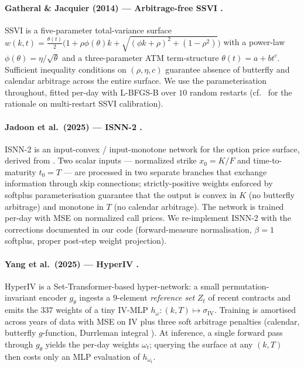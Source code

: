 \documentclass[11pt,a4paper]{article}
\newcommand{\iv}{\sigma_{\mathrm{IV}}}
\begin{document}
\paragraph{Gatheral \& Jacquier (2014) --- Arbitrage-free SSVI
\citep{gatheral2014ssvi}.} SSVI is a five-parameter total-variance surface
$w(k, t) = \tfrac{\theta(t)}{2}\bigl(1 + \rho \phi(\theta) k +
\sqrt{(\phi k + \rho)^2 + (1-\rho^2)}\bigr)$ with a power-law
$\phi(\theta) = \eta / \sqrt{\theta}$ and a three-parameter ATM
term-structure $\theta(t) = a + b t^{c}$. Sufficient inequality conditions
on $(\rho, \eta, c)$ guarantee absence of butterfly and calendar arbitrage
across the entire surface. We use the \citet{gatheral2014ssvi}
parameterisation throughout, fitted per-day with L-BFGS-B over $10$ random
restarts (cf.\ \citet{corbetta2018ssvi} for the rationale on multi-restart
SSVI calibration).

\paragraph{Jadoon et al.\ (2025) --- ISNN-2 \citep{jadoon2025isnn}.}
ISNN-2 is an input-convex / input-monotone network for the option price
surface, derived from \citet{amos2017icnn}. Two scalar inputs --- normalized
strike $x_0 = K/F$ and time-to-maturity $t_0 = T$ --- are processed in two
separate branches that exchange information through skip connections;
strictly-positive weights enforced by softplus parameterisation guarantee
that the output is convex in $K$ (no butterfly arbitrage) and monotone in
$T$ (no calendar arbitrage). The network is trained per-day with MSE on
normalized call prices. We re-implement ISNN-2 with the corrections
documented in our code (forward-measure normalisation, $\beta=1$ softplus,
proper post-step weight projection).

\paragraph{Yang et al.\ (2025) --- HyperIV \citep{yang2025hyperiv}.} HyperIV
is a Set-Transformer-based \citep{lee2019set,vaswani2017attention}
hyper-network: a small permutation-invariant encoder $g_\theta$ ingests a
$9$-element \emph{reference set} $Z_t$ of recent contracts and emits the
$337$ weights of a tiny IV-MLP $h_\omega : (k, T) \mapsto \iv$. Training is
amortised across years of data with MSE on IV plus three soft arbitrage
penalties (calendar, butterfly $g$-function, Durrleman integral
\citep{durrleman2010g}). At inference, a single forward pass through
$g_\theta$ yields the per-day weights $\omega_t$; querying the surface at
any $(k, T)$ then costs only an MLP evaluation of $h_{\omega_t}$.
\end{document}
